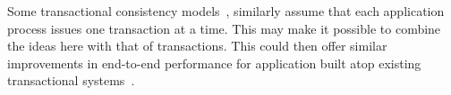 
Some transactional consistency
models~\cite{papadimitriou1979serializability,adya1999weakcons}, similarly assume that 
each application process issues one transaction at a time. This may 
make it possible to combine the ideas here with that of transactions. 
This could then offer similar improvements in end-to-end 
performance for application built atop existing transactional 
systems~\cite{thomson2014calvin,mahmoud2013replicatedCommit,zhang2018tapir,mu2014rococo,mu2016janus,kraska2013mdcc,ren2019slog,taft2020crdb,yan2018carousel}.






